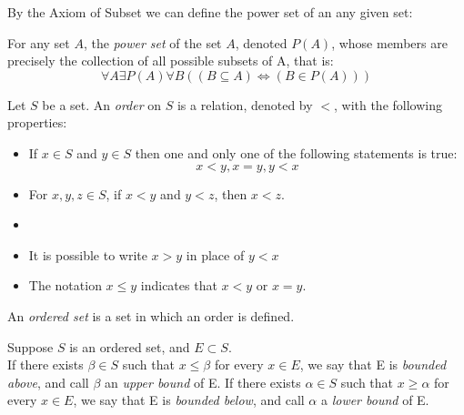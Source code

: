 \documentclass{report}
\begin{document}
			By the Axiom of Subset we can define the power set of an any given set:
			
			\begin{defn} \label{def_powerset}
				For any set $A$, the \emph{power set} of the set $A$, denoted $P(A)$, whose members are precisely the collection of all possible subsets of A, that is:
				\begin{displaymath}
					\forall A \exists P(A) \forall B((B \subseteq A) \Leftrightarrow (B \in P(A)))
				\end{displaymath}
			\end{defn}

			\begin{defn}[Order] \label{def_order}
				Let $S$ be a set. An \emph{order} on $S$ is a relation, denoted by $<$, with the following properties:
				\begin{itemize}
					\item If $x \in S$ and $y \in S$ then one and only one of the following statements is true:
					\begin{displaymath}
						x<y, x=y, y<x
					\end{displaymath}
					\item For $x,y,z \in S$, if $x<y$ and $y<z$, then $x<z$.
				\end{itemize}
			\end{defn}

			\begin{remark} \label{remark_order}
				\begin{itemize}
					\item[]
					\item It is possible to write $x>y$ in place of $y<x$
					\item The notation $x \leq y$ indicates that $x<y$ or $x=y$.
				\end{itemize}
			\end{remark}

		\begin{defn} \label{def_ordered_set}
			An \emph{ordered set} is a set in which an order is defined.
		\end{defn}

		\begin{defn}[Bound] \label{def_bound}
			Suppose $S$ is an ordered set, and $E\subset S$.\\
			If there exists $\beta \in S$ such that $x \leq \beta$ for every $x \in E$, we say that E is \emph{bounded above}, and call $\beta$ an \emph{upper bound} of E.
			If there exists $\alpha \in S$ such that $x \geq \alpha$ for every $x \in E$, we say that E is \emph{bounded below}, and call $\alpha$ a \emph{lower bound} of E.
		\end{defn}
\end{document}

